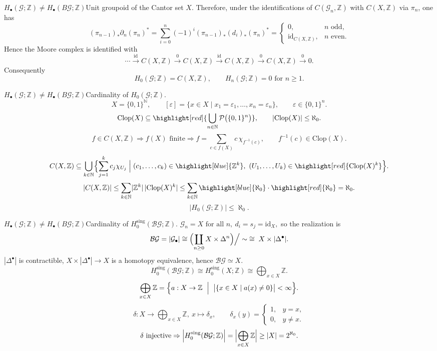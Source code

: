 \documentclass[aspectratio=169]{beamer}
\newcommand{\G}{\mathcal{G}}
\newcommand{\ZZ}{\mathbb{Z}}
\begin{document}
\begin{frame}{$H_\bullet(\G;\ZZ) \neq H_\bullet(B\G;\ZZ)$}{Unit groupoid of the Cantor set $X$.}
Therefore, under the identifications of $C(\G_n,\ZZ)$ with $C(X,\ZZ)$ via $\pi_n$, one has
\[
(\pi_{n-1})_*\partial_n(\pi_n)^*
=
\sum_{i=0}^n(-1)^i(\pi_{n-1})_*(d_i)_*(\pi_n)^*
=
\begin{cases}
0, & n \text{ odd},\\
\mathrm{id}_{C(X,\ZZ)}, & n \text{ even}.
\end{cases}
\]
Hence the Moore complex is identified with
\[
\cdots \xrightarrow{\ \mathrm{id}\ } C(X,\ZZ) \xrightarrow{\ 0\ } C(X,\ZZ) \xrightarrow{\ \mathrm{id}\ } C(X,\ZZ) \xrightarrow{\ 0\ } C(X,\ZZ) \xrightarrow{\ 0\ } 0.
\]
Consequently
\[
H_0({\G};\ZZ)=C(X,\ZZ),
\qquad
H_n({\G};\ZZ)=0 \text{ for } n\ge 1.
\]
\end{frame}

\begin{frame}{$H_\bullet(\G;\ZZ) \neq H_\bullet(B\G;\ZZ)$}{Cardinality of $H_0({\G};\ZZ)$.}
\[
X=\{0,1\}^{\mathbb{N}},
\qquad
[\varepsilon]=\{x\in X\mid x_1=\varepsilon_1,\dots,x_n=\varepsilon_n\},
\qquad
\varepsilon\in\{0,1\}^n.
\]\pause
\[
\mathrm{Clop}(X)\subseteq \highlight[red]{\bigcup_{n\in\mathbb{N}}\mathcal P\bigl(\{0,1\}^n\bigr)},
\qquad
\lvert \mathrm{Clop}(X)\rvert\le \aleph_0.
\]\pause
\[
f\in C(X,\ZZ)
\Rightarrow
f(X) \text{ finite}
\Rightarrow
f=\sum_{c\in f(X)} c\,\chi_{f^{-1}(c)},
\qquad
f^{-1}(c)\in \mathrm{Clop}(X).
\]\pause
\[
C(X,\ZZ)\subseteq \bigcup_{k\in\mathbb{N}}\Bigl\{
\sum_{j=1}^k c_j\chi_{U_j}
\Bigm\vert
(c_1,\dots,c_k)\in\highlight[blue]{\ZZ^k},\ (U_1,\dots,U_k)\in\highlight[red]{\mathrm{Clop}(X)^k}
\Bigr\}.
\]\pause
\[
\lvert C(X,\ZZ)\rvert
\le
\sum_{k\in\mathbb{N}}\lvert \ZZ^k\rvert\,\lvert \mathrm{Clop}(X)^k\rvert
\le
\sum_{k\in\mathbb{N}}\highlight[blue]{\aleph_0}\cdot \highlight[red]{\aleph_0}
=
\aleph_0.
\]
\[
\lvert H_0({\G};\ZZ)\rvert\le \aleph_0.
\]
\end{frame}

\begin{frame}{$H_\bullet(\G;\ZZ) \neq H_\bullet(B\G;\ZZ)$}{Cardinality of $H^{\mathrm{sing}}_0(\mathcal B{\G};\ZZ)$.}
\(
{\G}_n=X \text{ for all } n,\ d_i=s_j=\mathrm{id}_X,
\)
so the realization is
\[
\mathcal B{\G}=|{\G}_\bullet|\cong \Bigl(\coprod_{n\ge 0} X\times\Delta^n\Bigr)\Big/\sim \;\cong\; X\times |\Delta^\bullet|.
\]
$|\Delta^\bullet|$ is contractible, $X\times|\Delta^\bullet|\to X$ is a homotopy equivalence, hence $\mathcal B{\G}\simeq X$.\pause
\[
H^{\mathrm{sing}}_0(\mathcal B{\G};\ZZ)\cong H^{\mathrm{sing}}_0(X;\ZZ)\cong \bigoplus_{x\in X}\ZZ.
\]\pause
\[
\bigoplus_{x\in X}\ZZ
=
\Bigl\{a:X\to \ZZ \ \Bigm\vert\ \bigl\lvert\{x\in X\mid a(x)\ne 0\}\bigr\rvert<\infty\Bigr\}.
\]\pause
\[
\delta\colon X\to \bigoplus_{x\in X}\ZZ,\ 
x \mapsto \delta_x,
\qquad
\delta_x(y)=
\begin{cases}
1, & y=x,\\
0, & y\ne x.
\end{cases}
\]\pause
\[
\delta \text{ injective}
\Rightarrow
\Bigl\lvert H^{\mathrm{sing}}_0(\mathcal B{\G};\ZZ)\Bigr\rvert
=
\Bigl\lvert \bigoplus_{x\in X}\ZZ\Bigr\rvert
\ge
\lvert X\rvert
=
2^{\aleph_0}.
\]
\end{frame}
\end{document}
